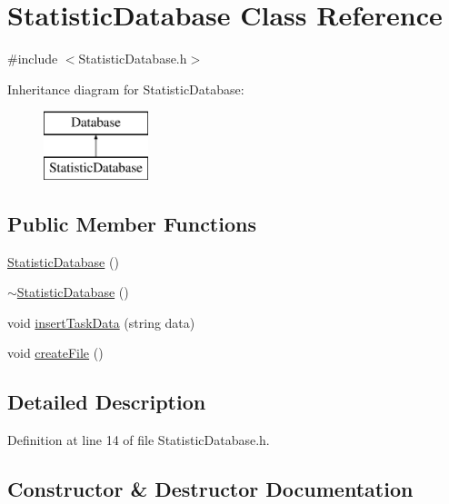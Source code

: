 \hypertarget{class_statistic_database}{}\section{Statistic\+Database Class Reference}
\label{class_statistic_database}


{\ttfamily \#include $<$Statistic\+Database.\+h$>$}

Inheritance diagram for Statistic\+Database\+:\begin{figure}[H]
\begin{center}
\leavevmode
\includegraphics[height=2.000000cm]{class_statistic_database}
\end{center}
\end{figure}
\subsection*{Public Member Functions}
\begin{DoxyCompactItemize}
\item 
\hyperlink{class_statistic_database_ad473bf53d5bb60bc208237c865f54c54}{Statistic\+Database} ()
\item 
\hyperlink{class_statistic_database_a525577cd0e9802e6d57d9e451628d31a}{$\sim$\+Statistic\+Database} ()
\item 
void \hyperlink{class_statistic_database_ab900a61b8b7bb8831310595ec218d9a7}{insert\+Task\+Data} (string data)
\item 
void \hyperlink{class_statistic_database_a61738008aaa921c5e25248944e003763}{create\+File} ()
\end{DoxyCompactItemize}


\subsection{Detailed Description}


Definition at line 14 of file Statistic\+Database.\+h.



\subsection{Constructor \& Destructor Documentation}
\hypertarget{class_statistic_database_ad473bf53d5bb60bc208237c865f54c54}{}
